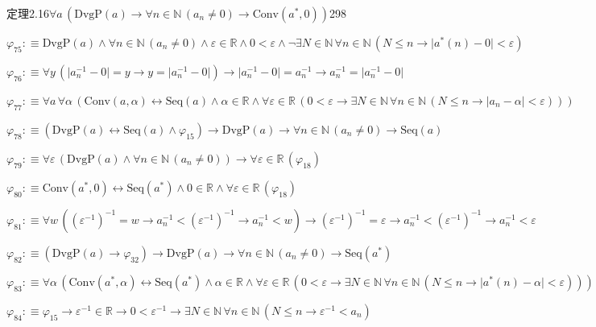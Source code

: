 \begin{fullproof}{定理2.16}{$\forall a\,(\mathrm{DvgP}(a) \to \forall n \in \mathbb{N}\,(a_{n} \neq 0) \to \mathrm{Conv}(a^{\ast},0))$}{298}
\begin{abbrevlist}
\item $\varphi_{75} :\equiv \mathrm{DvgP}(a) \land \forall n \in \mathbb{N}\,(a_{n} \neq 0) \land \varepsilon \in \mathbb{R} \land 0 < \varepsilon \land \neg \exists N \in \mathbb{N}\,\forall n \in \mathbb{N}\,(N \leq n \to \lvert a^{\ast}(n) - 0 \rvert < \varepsilon)$
\item $\varphi_{76} :\equiv \forall y\,(\lvert a_{n}^{-1} - 0 \rvert = y \to y = \lvert a_{n}^{-1} - 0 \rvert) \to \lvert a_{n}^{-1} - 0 \rvert = a_{n}^{-1} \to a_{n}^{-1} = \lvert a_{n}^{-1} - 0 \rvert$
\item $\varphi_{77} :\equiv \forall a\,\forall \alpha\,(\mathrm{Conv}(a,\alpha) \leftrightarrow \mathrm{Seq}(a) \land \alpha \in \mathbb{R} \land \forall \varepsilon \in \mathbb{R}\,(0 < \varepsilon \to \exists N \in \mathbb{N}\,\forall n \in \mathbb{N}\,(N \leq n \to \lvert a_{n} - \alpha \rvert < \varepsilon)))$
\item $\varphi_{78} :\equiv (\mathrm{DvgP}(a) \leftrightarrow \mathrm{Seq}(a) \land \varphi_{15}) \to \mathrm{DvgP}(a) \to \forall n \in \mathbb{N}\,(a_{n} \neq 0) \to \mathrm{Seq}(a)$
\item $\varphi_{79} :\equiv \forall \varepsilon\,(\mathrm{DvgP}(a) \land \forall n \in \mathbb{N}\,(a_{n} \neq 0)) \to \forall \varepsilon \in \mathbb{R}\,(\varphi_{18})$
\item $\varphi_{80} :\equiv \mathrm{Conv}(a^{\ast},0) \leftrightarrow \mathrm{Seq}(a^{\ast}) \land 0 \in \mathbb{R} \land \forall \varepsilon \in \mathbb{R}\,(\varphi_{18})$
\item $\varphi_{81} :\equiv \forall w\,((\varepsilon^{-1})^{-1} = w \to a_{n}^{-1} < (\varepsilon^{-1})^{-1} \to a_{n}^{-1} < w) \to (\varepsilon^{-1})^{-1} = \varepsilon \to a_{n}^{-1} < (\varepsilon^{-1})^{-1} \to a_{n}^{-1} < \varepsilon$
\item $\varphi_{82} :\equiv (\mathrm{DvgP}(a) \to \varphi_{32}) \to \mathrm{DvgP}(a) \to \forall n \in \mathbb{N}\,(a_{n} \neq 0) \to \mathrm{Seq}(a^{\ast})$
\item $\varphi_{83} :\equiv \forall \alpha\,(\mathrm{Conv}(a^{\ast},\alpha) \leftrightarrow \mathrm{Seq}(a^{\ast}) \land \alpha \in \mathbb{R} \land \forall \varepsilon \in \mathbb{R}\,(0 < \varepsilon \to \exists N \in \mathbb{N}\,\forall n \in \mathbb{N}\,(N \leq n \to \lvert a^{\ast}(n) - \alpha \rvert < \varepsilon)))$
\item $\varphi_{84} :\equiv \varphi_{15} \to \varepsilon^{-1} \in \mathbb{R} \to 0 < \varepsilon^{-1} \to \exists N \in \mathbb{N}\,\forall n \in \mathbb{N}\,(N \leq n \to \varepsilon^{-1} < a_{n})$

\end{abbrevlist}
\end{fullproof}

